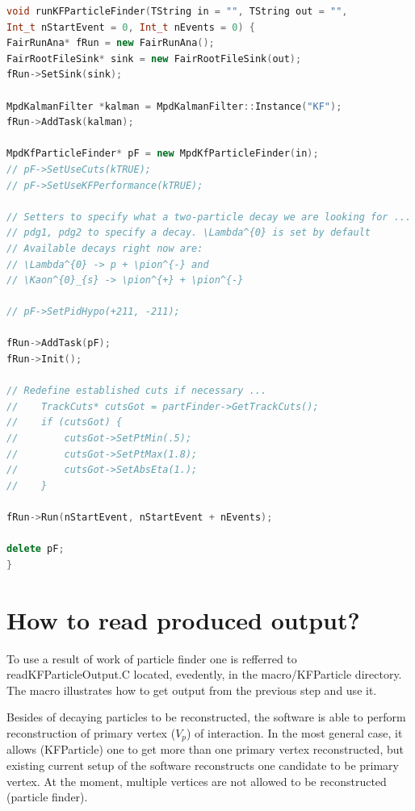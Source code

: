 \documentclass[8pt,a5paper, oldfontcommands]{memoir}
\begin{document}
 \newpage
 \thispagestyle{plain}
{ \scriptsize
\begin{lstlisting}[language=C++,basicstyle=\ttfamily,keywordstyle=\color{red}, commentstyle=\color{blue}]
void runKFParticleFinder(TString in = "", TString out = "",
Int_t nStartEvent = 0, Int_t nEvents = 0) {
FairRunAna* fRun = new FairRunAna();
FairRootFileSink* sink = new FairRootFileSink(out);
fRun->SetSink(sink);

MpdKalmanFilter *kalman = MpdKalmanFilter::Instance("KF");
fRun->AddTask(kalman);

MpdKfParticleFinder* pF = new MpdKfParticleFinder(in);
// pF->SetUseCuts(kTRUE);
// pF->SetUseKFPerformance(kTRUE);
    
// Setters to specify what a two-particle decay we are looking for ... 
// pdg1, pdg2 to specify a decay. \Lambda^{0} is set by default
// Available decays right now are:
// \Lambda^{0} -> p + \pion^{-} and
// \Kaon^{0}_{s} -> \pion^{+} + \pion^{-}

// pF->SetPidHypo(+211, -211);
    
fRun->AddTask(pF);
fRun->Init();

// Redefine established cuts if necessary ...
//    TrackCuts* cutsGot = partFinder->GetTrackCuts();
//    if (cutsGot) {
//        cutsGot->SetPtMin(.5);
//        cutsGot->SetPtMax(1.8);
//        cutsGot->SetAbsEta(1.);
//    }

fRun->Run(nStartEvent, nStartEvent + nEvents);
    
delete pF;
} 
\end{lstlisting}
}

\newpage
\section{How to read produced output?}
\thispagestyle{plain}

To use a result of work of particle finder one is refferred to {\color{blue} readKFParticleOutput.C} located, evedently, in the macro/KFParticle directory.
The macro illustrates how to get output from the previous step and use it.

Besides of decaying particles to be reconstructed, the software is able to perform reconstruction of primary vertex ($V_{p}$) of interaction. In the most general case,
it allows (KFParticle) one to get more than one primary vertex reconstructed, but existing current setup of the software reconstructs one candidate to be primary vertex.
At the moment, multiple vertices are not allowed to be reconstructed (particle finder).
\end{document}
